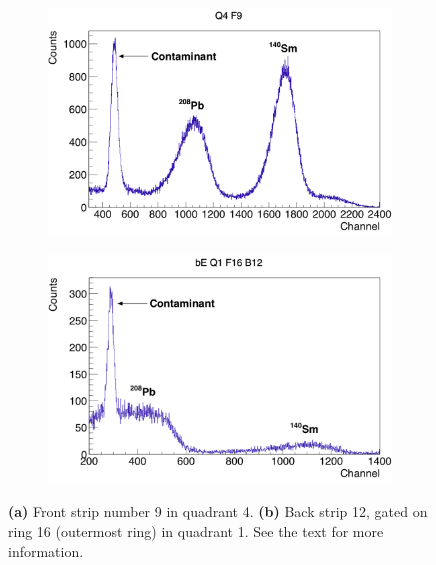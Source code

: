 \documentclass[twoside,english]{uiofysmaster/uiofysmaster}
\begin{document}
\begin{figure}[htb!]
	\centering
	\begin{subfigure}[b]{0.49\textwidth}
		\centering
		\includegraphics[width=\textwidth]{../Plots/plotting/TB_Q4_F9.png}
		\caption{}
		\label{fig:CD_cal_easy}
	\end{subfigure}
	\hfill
	\begin{subfigure}[b]{0.49\textwidth}
		\centering
		\includegraphics[width=\textwidth]{../Plots/plotting/bE_Q1_f16_b12.png}
		\caption{}
		\label{fig:CD_cal_difficult}
	\end{subfigure}
	\caption{\textbf{(a)} Front strip number 9 in quadrant 4. 
	\textbf{(b)} Back strip 12, gated on ring 16 (outermost ring) in quadrant 1. 
	See the text for more information.}
	\label{fig:cal_ED}
\end{figure}
\end{document}
